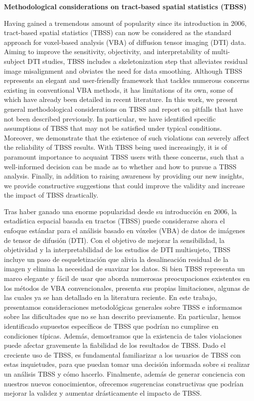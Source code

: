 \documentclass{article}
\begin{document}
\textbf{Methodological considerations on tract-based spatial statistics (TBSS)}

\hfill

Having gained a tremendous amount of popularity since its introduction in 2006, tract-based spatial 
statistics (TBSS) can now be considered as the standard approach for voxel-based analysis (VBA) of 
diffusion tensor imaging (DTI) data. Aiming to improve the sensitivity, objectivity, and interpretability 
of multi-subject DTI studies, TBSS includes a skeletonization step that alleviates residual image 
misalignment and obviates the need for data smoothing. Although TBSS represents an elegant and 
user-friendly framework that tackles numerous concerns existing in conventional VBA methods, it has 
limitations of its own, some of which have already been detailed in recent literature. In this work, we 
present general methodological considerations on TBSS and report on pitfalls that have not been described 
previously. In particular, we have identified specific assumptions of TBSS that may not be satisfied under 
typical conditions. Moreover, we demonstrate that the existence of such violations can severely affect the 
reliability of TBSS results. With TBSS being used increasingly, it is of paramount importance to acquaint 
TBSS users with these concerns, such that a well-informed decision can be made as to whether and how to 
pursue a TBSS analysis. Finally, in addition to raising awareness by providing our new insights, we provide 
constructive suggestions that could improve the validity and increase the impact of TBSS drastically.

{\color{blue} Tras haber ganado una enorme popularidad desde su introducción en 2006, la estadística 
espacial basada en tractos (TBSS) puede considerarse ahora el enfoque estándar para el análisis basado en 
vóxeles (VBA) de datos de imágenes de tensor de difusión (DTI). Con el objetivo de mejorar la 
sensibilidad, la objetividad y la interpretabilidad de los estudios de DTI multisujeto, TBSS incluye un 
paso de esqueletización que alivia la desalineación residual de la imagen y elimina la necesidad de 
suavizar los datos. Si bien TBSS representa un marco elegante y fácil de usar que aborda numerosas 
preocupaciones existentes en los métodos de VBA convencionales, presenta sus propias limitaciones, algunas 
de las cuales ya se han detallado en la literatura reciente. En este trabajo, presentamos consideraciones 
metodológicas generales sobre TBSS e informamos sobre las dificultades que no se han descrito previamente. 
En particular, hemos identificado supuestos específicos de TBSS que podrían no cumplirse en condiciones 
típicas. Además, demostramos que la existencia de tales violaciones puede afectar gravemente la fiabilidad 
de los resultados de TBSS. Dado el creciente uso de TBSS, es fundamental familiarizar a los usuarios de 
TBSS con estas inquietudes, para que puedan tomar una decisión informada sobre si realizar un análisis 
TBSS y cómo hacerlo. Finalmente, además de generar conciencia con nuestros nuevos conocimientos, ofrecemos 
sugerencias constructivas que podrían mejorar la validez y aumentar drásticamente el impacto de TBSS.}


 
\end{document}
